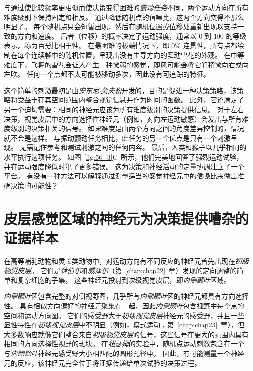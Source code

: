 与通过使比较频率更相似而使决策变得困难的\textit{震动任务}不同，两个运动方向在所有难度级别下保持固定和相反。
通过降低随机点的信噪比，这两个方向变得不那么明显了。
每个随机点只会短暂出现，然后在随机位置或位移处重新出现以支持一致的方向和速度。
后者（位移）的概率决定了运动强度，通常以 0 到 100 的等级表示，称为百分比相干性。
在最困难的极端情况下，即 0\% 连贯性，所有点都绘制在每个连续帧中的随机位置，呈现出没有主导方向的舞动雪花的外观。
在中等难度下，飞舞的雪花会让人产生一种微弱的感觉，即风可能会将它们稍微向右或向左吹。
任何一个点都不太可能被移动多次，因此没有可追踪的特征。


这个简单的刺激最初是由\textit{安东尼$\cdot$莫夫松}开发的，目的是促进一种决策策略，该策略将受益于在其空间范围内整合视觉信息并作为时间的函数。
此外，它还满足了另一个迫切需要：相同的神经元应该为所有难度级别的决策提供信息。
对于左右决策，视觉皮层中的方向选择性神经元（例如，对向左运动敏感）会发出与所有难度级别的决策相关的信号。
如果难度是由两个方向之间的角度差异控制的，情况就不会是这样。
与振动颤动任务相比，此任务的另一个优点是只有一个刺激呈现。
无需记住参考和测试刺激之间的任何内容。
最后，人类和猴子以几乎相同的水平执行这项任务。
如图~\ref{fig:56_3}C~所示，他们完美地回答了强烈运动试验，并在运动强度降低时犯了更多错误。
这为决策和神经活动的定量协调建立了一个平台。
有没有一种方法可以解释通过测量适当的感觉神经元中的信噪比来做出准确决策的可能性？



\section{皮层感觉区域的神经元为决策提供嘈杂的证据样本}

在高等哺乳动物和灵长类动物中，对运动方向有不同反应的神经元首先出现在\textit{初级视觉皮层}。
它们是\textit{休伯尔}和\textit{威泽尔}（第~\ref{chap:chap22}~章）发现的定向调整的简单和复杂细胞的子集。
这些神经元投射到次级视觉皮层，即\textit{内侧颞叶}区域。


\textit{内侧颞叶}区包含完整的对侧视野图，几乎所有\textit{内侧颞叶}区的神经元都具有方向选择性。
具有相似方向偏好的神经元聚集在一起，因此\textit{内侧颞叶}包含视野中每个点的空间和运动方向图。
它们的感受野大于\textit{初级视觉皮层}神经元的感受野，并且一些显性特性在\textit{初级视觉皮层}中不明显（例如，模式运动；第~\ref{chap:chap23}~章），但大多数响应就像它们整合来自\textit{初级视觉皮层}的信号，这些信号在更大的范围内具有相同的方向选择性视野的斑块。
在\textit{纽瑟姆}的实验中，随机点运动刺激包含在一个与\textit{内侧颞叶}神经元感受野大小相匹配的圆形孔径中。
因此，有可能测量一个神经元的反应，该神经元完全位于将证据传递给单次试验的决策过程。


